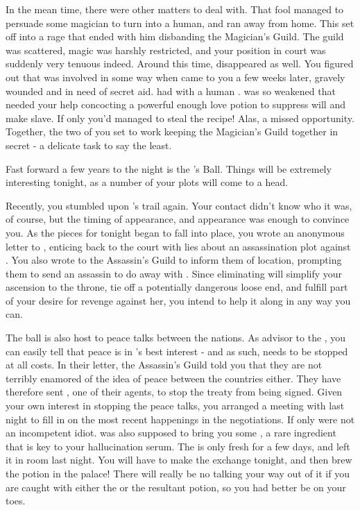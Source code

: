\documentclass[char]{NeptuneBall}
\begin{document}
In the mean time, there were other matters to deal with. That fool \cAriel{} managed to persuade some magician to turn \cAriel{\them} into a human, and ran away from home. This set \cKing{} off into a rage that ended with him disbanding the Magician's Guild. The guild was scattered, magic was harshly restricted, and your position in court was suddenly very tenuous indeed. Around this time, \cWitch{} disappeared as well. You figured out that \cWitch{\they} was involved in some way when \cWitch{\they} came to you a few weeks later, gravely wounded and in need of secret aid. \cWitch{\They} had with \cWitch{\them} a human \cSlave{\Prince}. \cWitch{} was so weakened that \cWitch{\they} needed your help concocting a powerful enough love potion to suppress \cSlave{\their} will and make \cSlave{\them} \cWitch{\them} slave. If only you'd managed to steal the recipe! Alas, a missed opportunity. Together, the two of you set to work keeping the Magician's Guild together in secret - a delicate task to say the least.

Fast forward a few years to the night is the \cExExKing{}'s Ball. Things will be extremely interesting tonight, as a number of your plots will come to a head.

Recently, you stumbled upon \cQueen{}'s trail again. Your contact didn't know who it was, of course, but the timing of \cQueen{\their} appearance, and \cQueen{\them} appearance was enough to convince you. As the pieces for tonight began to fall into place, you wrote an anonymous letter to \cQueen{}, enticing \cQueen{\them} back to the court with lies about an assassination plot against \cKing{}. You also wrote to the Assassin's Guild to inform them of \cQueen{\their} location, prompting them to send an assassin to do away with \cQueen{}. Since eliminating \cQueen{} will simplify your ascension to the throne, tie off a potentially dangerous loose end, and fulfill part of your desire for revenge against her, you intend to help it along in any way you can.

The ball is also host to peace talks between the nations. As advisor to the \cKing{\King}, you can easily tell that peace is in \pAtlantis{}'s best interest - and as such, needs to be stopped at all costs. In their letter, the Assassin's Guild told you that they are not terribly enamored of the idea of peace between the countries either. They have therefore sent \cSpy{}, one of their agents, to stop the treaty from being signed. Given your own interest in stopping the peace talks, you arranged a meeting with \cSpy{\them} last night to fill \cSpy{\them} in on the most recent happenings in the negotiations. If only \cSpy{} were not an incompetent idiot.  \cSpy{\They} was also supposed to bring you some \iHemlock{\MYname}, a rare ingredient that is key to your hallucination serum. The \iHemlock{\MYname} is only fresh for a few days, and \cSpy{} left it in \cSpy{\them} room last night. You will have to make the exchange tonight, and then brew the potion in the palace! There will really be no talking your way out of it if you are caught with either the \iHemlock{\MYname} or the resultant potion, so you had better be on your toes.
\end{document}
